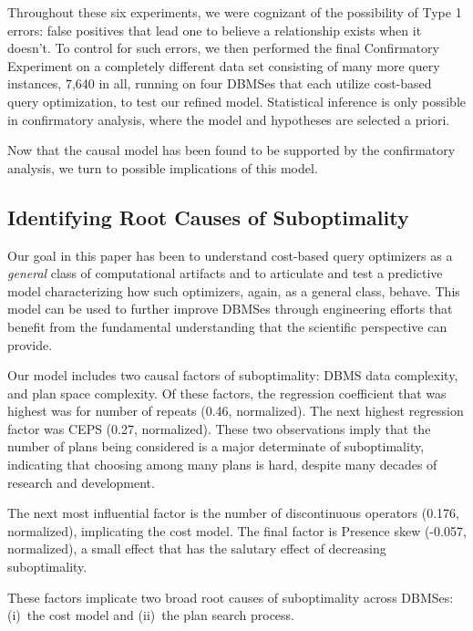 \documentclass[prodmode,acmtods]{acmsmall}
\begin{document}
Throughout these six experiments, we were cognizant of the
possibility of Type 1 errors: false positives that lead one to believe a
relationship exists when it doesn't.
To control for such errors, we then performed the final Confirmatory 
Experiment on a completely different data set consisting of many more 
query instances, 7,640 in all, running on four \hbox{DBMSes} that each
utilize cost-based query optimization, to test
our refined model. Statistical inference is only possible in confirmatory
analysis, where the model and hypotheses are selected a priori.

Now that the causal model has been found to be supported by the confirmatory
\hbox{analysis}, we turn to possible implications of this model.

\subsection{Identifying Root Causes of Suboptimality}\label{sec:root}

Our goal in this paper has been to understand cost-based query optimizers
as a \hbox{\em general} class of computational artifacts and to articulate and test
a predictive model \hbox{characterizing} how such optimizers,
again, as a general class, behave.  This model can be used to further
improve \hbox{DBMSes} through engineering \hbox{efforts} that benefit from the fundamental
understanding that the scientific perspective can provide.

Our model includes two causal factors of suboptimality: \hbox{DBMS} data complexity, and plan space complexity. Of these factors,
the regression \hbox{coefficient} that was highest was for number of repeats (0.46, normalized). The next \hbox{highest}
regression factor was CEPS (0.27, normalized). These two observations imply that the
number of plans being considered is a major determinate of
suboptimality, indicating that choosing among many plans is hard, despite
many decades of research and development.

The next most influential factor is the number of discontinuous operators
(0.176, normalized),
\hbox{implicating} the cost model. The final factor is Presence skew (-0.057, normalized), a small effect that has the salutary effect of
decreasing suboptimality.

These factors implicate two broad root causes of suboptimality across \hbox{DBMSes}:
(i)~the cost model and (ii)~the plan search process.
\end{document}
